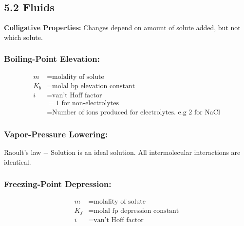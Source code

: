 \subsection{5.2 Fluids}
    \textbf{Colligative Properties: }Changes depend on amount of solute added, but not which solute.
    
    \subsubsection{Boiling-Point Elevation: }
        \begin{align*}
            m & = \text{molality of solute}\\
            K_b & = \text{molal bp elevation constant}\\
            i & = \text{van't Hoff factor}\\
            & = 1 \text{ for non-electrolytes}\\
            & = \text{Number of ions produced for electrolytes.\ e.g 2 for NaCl}
        \end{align*}
    
    \subsubsection{Vapor-Pressure Lowering: }
    
        Raoult's law $-$ Solution is an ideal solution. All intermolecular interactions are identical. 
        \vspace*{0.5em}

    \subsubsection{Freezing-Point Depression: }
        \begin{align*}
            m & = \text{molality of solute}\\
            K_f & = \text{molal fp depression constant}\\
            i & = \text{van't Hoff factor}
        \end{align*}